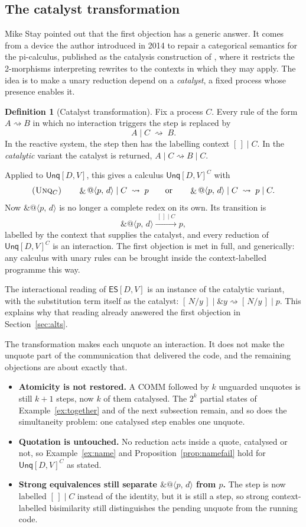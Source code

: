 \documentclass[11pt,a4paper]{article}
\makeatletter
\theoremstyle{plain}
\theoremstyle{definition}
\newtheorem{definition}[theorem]{Definition}
\theoremstyle{remark}
\newcommand{\qn}[2]{@\langle #1,\,#2\rangle}
\newcommand{\unq}[1]{\mathop{\&}#1}
\newcommand{\esub}[2]{[\,#1/#2\,]}
\newcommand{\red}{\rightsquigarrow}
\newcommand{\Unq}{\textsf{Unq}[D,V]}
\newcommand{\ES}{\textsf{ES}[D,V]}
\makeatother
\begin{document}
\subsection{The catalyst transformation}\label{sec:catalyst}

Mike Stay pointed out that the first objection has a generic answer. It comes
from a device the author introduced in 2014 to repair a categorical semantics
for the pi-calculus, published as the catalysis construction of \cite{SM15},
where it restricts the 2-morphisms interpreting rewrites to the contexts in
which they may apply. The idea is to make a unary reduction depend on a \emph{catalyst}, a fixed
process whose presence enables it.

\begin{definition}[Catalyst transformation]
Fix a process $C$. Every rule of the form $A\red B$ in which no interaction
triggers the step is replaced by
\[
  A\mid C\;\red\;B .
\]
In the reactive system, the step then has the labelling context
$[\,]\mid C$. In the \emph{catalytic} variant the catalyst is returned,
$A\mid C\red B\mid C$.
\end{definition}

Applied to $\Unq$, this gives a calculus $\Unq^{C}$ with
\[
  \textsc{(Unq$_C$)}\qquad \unq{\qn{p}{d}}\mid C\;\red\;p
  \qquad\text{or}\qquad
  \unq{\qn{p}{d}}\mid C\;\red\;p\mid C .
\]
Now $\unq{\qn{p}{d}}$ is no longer a complete redex on its own. Its transition
is
\[
  \unq{\qn{p}{d}}\xrightarrow{\;[\,]\mid C\;}p ,
\]
labelled by the context that supplies the catalyst, and every reduction of $\Unq^{C}$ is an interaction. The
first objection is met in full, and generically: any calculus with unary rules
can be brought inside the context-labelled programme this way.

The interactional reading of $\ES$ is an instance of the catalytic variant,
with the substitution term itself as the catalyst:
$\esub{N}{y}\mid\unq{y}\red\esub{N}{y}\mid p$. This explains why that reading
already answered the first objection in Section~\ref{sec:alts}.

The transformation makes each unquote an interaction. It does not make the
unquote part of the communication that delivered the code, and the remaining
objections are about exactly that.
\begin{itemize}[leftmargin=1.5em]
\item \textbf{Atomicity is not restored.} A COMM followed by $k$ unguarded
  unquotes is still $k+1$ steps, now $k$ of them catalysed. The $2^k$ partial
  states of Example~\ref{ex:together} and of the next subsection remain, and so
  does the simultaneity problem: one catalysed step enables one unquote.
\item \textbf{Quotation is untouched.} No reduction acts inside a quote,
  catalysed or not, so Example~\ref{ex:name} and
  Proposition~\ref{prop:namefail} hold for $\Unq^{C}$ as stated.
\item \textbf{Strong equivalences still separate $\unq{\qn{p}{d}}$ from $p$.}
  The step is now labelled $[\,]\mid C$ instead of the identity, but it is
  still a step, so strong context-labelled bisimilarity still distinguishes
  the pending unquote from the running code.
\end{itemize}
\end{document}
